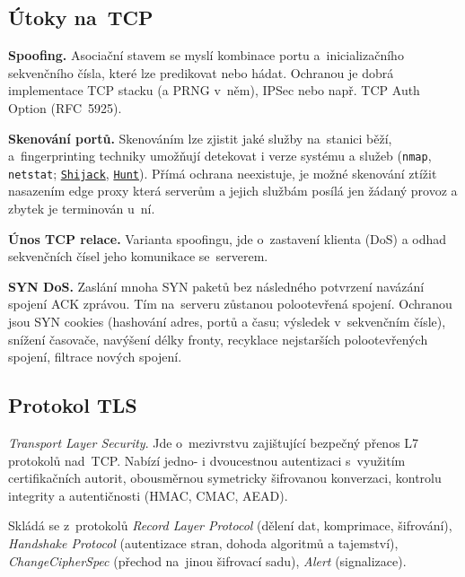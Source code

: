\subsection{Útoky na~TCP}

\textbf{Spoofing.}
Asociační stavem se myslí kombinace portu a~inicializačního sekvenčního čísla, které lze predikovat nebo hádat.
Ochranou je dobrá implementace TCP stacku (a PRNG v~něm), IPSec nebo např. TCP Auth Option (RFC~5925).

\textbf{Skenování portů.}
Skenováním lze zjistit jaké služby na~stanici běží, a~fingerprinting techniky umožňují detekovat i verze systému a služeb (\texttt{nmap}, \texttt{netstat}; \href{https://github.com/hackman/shijack}{\texttt{Shijack}}, \href{https://linux.die.net/man/1/hunt}{\texttt{Hunt}}).
Přímá ochrana neexistuje, je možné skenování ztížit nasazením edge proxy která serverům a jejich službám posílá jen žádaný provoz a zbytek je terminován u~ní.

\textbf{Únos TCP relace.}
Varianta spoofingu, jde o~zastavení klienta (DoS) a odhad sekvenčních čísel jeho komunikace se~serverem.

\textbf{SYN DoS.}
Zaslání mnoha SYN paketů bez následného potvrzení navázání spojení ACK zprávou.
Tím na~serveru zůstanou polootevřená spojení.
Ochranou jsou SYN cookies (hashování adres, portů a času; výsledek v~sekvenčním čísle), snížení časovače, navýšení délky fronty, recyklace nejstarších polootevřených spojení, filtrace nových spojení.


\vfill
\subsection{Protokol TLS}

\emph{Transport Layer Security}.
Jde o~mezivrstvu zajištující bezpečný přenos L7 protokolů nad~TCP.
Nabízí jedno- i dvoucestnou autentizaci s~využitím certifikačních autorit, obousměrnou symetricky šifrovanou konverzaci, kontrolu integrity a autentičnosti (HMAC, CMAC, AEAD).

Skládá se z~protokolů \emph{Record Layer Protocol} (dělení dat, komprimace, šifrování), \emph{Handshake Protocol} (autentizace stran, dohoda algoritmů a tajemství), \emph{ChangeCipherSpec} (přechod na~jinou šifrovací sadu), \emph{Alert} (signalizace).

